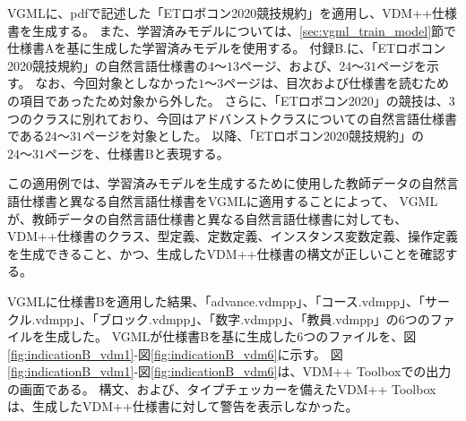 VGMLに、pdfで記述した「ETロボコン2020競技規約」\cite{ET_robo}を適用し、VDM++仕様書を生成する。
また、学習済みモデルについては、\ref{sec:vgml_train_model}節で仕様書Aを基に生成した学習済みモデルを使用する。
付録B.に、「ETロボコン2020競技規約」の自然言語仕様書の$4～13$ページ、および、$24～31$ページを示す。
なお、今回対象としなかった$1～3$ページは、目次および仕様書を読むための項目であったため対象から外した。
さらに、「ETロボコン2020」の競技は、3つのクラスに別れており、今回はアドバンストクラスについての自然言語仕様書である$24～31$ページを対象とした。
以降、「ETロボコン2020競技規約」の$24～31$ページを、仕様書Bと表現する。

この適用例では、学習済みモデルを生成するために使用した教師データの自然言語仕様書と異なる自然言語仕様書をVGMLに適用することによって、
VGMLが、教師データの自然言語仕様書と異なる自然言語仕様書に対しても、
VDM++仕様書のクラス、型定義、定数定義、インスタンス変数定義、操作定義を生成できること、かつ、生成したVDM++仕様書の構文が正しいことを確認する。

VGMLに仕様書Bを適用した結果、「advance.vdmpp」、「コース.vdmpp」、「サークル.vdmpp」、「ブロック.vdmpp」、「数字.vdmpp」、「教員.vdmpp」の6つのファイルを生成した。
VGMLが仕様書Bを基に生成した6つのファイルを、図\ref{fig:indicationB_vdm1}-図\ref{fig:indicationB_vdm6}に示す。
図\ref{fig:indicationB_vdm1}-図\ref{fig:indicationB_vdm6}は、VDM++ Toolbox\cite{Tools}での出力の画面である。
構文、および、タイプチェッカーを備えたVDM++ Toolboxは、生成したVDM++仕様書に対して警告を表示しなかった。

